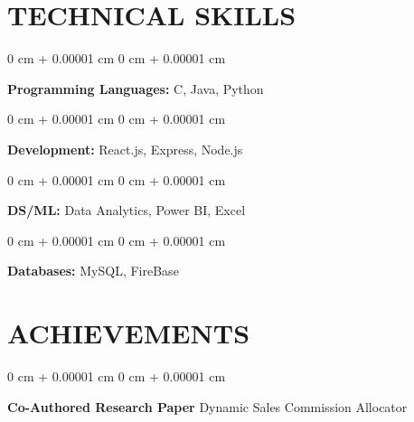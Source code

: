 \documentclass[10pt, letterpaper]{article}
\newenvironment{onecolentry}{
    \begin{adjustwidth}{
        0 cm + 0.00001 cm
    }{
        0 cm + 0.00001 cm
    }
}{
    \end{adjustwidth}
} %
\begin{document}
\section{\Large TECHNICAL SKILLS}



        
        \begin{onecolentry}
           \fontsize{12pt}{12pt}\textbf{Programming Languages:}  \fontsize{12pt}{12pt}\selectfont C, Java, Python
        \end{onecolentry}

        \vspace{0.2 cm}

        \begin{onecolentry}
            \fontsize{12pt}{12pt}\textbf{Development:} 
            \fontsize{12pt}{12pt}\selectfont React.js, Express, Node.js
        \end{onecolentry}
        \vspace{0.2 cm}

        \begin{onecolentry}
            \fontsize{12pt}{12pt}\textbf{DS/ML:} 
            \fontsize{12pt}{12pt}\selectfont Data Analytics, Power BI, Excel
        \end{onecolentry}

        \vspace{0.2 cm}

        \begin{onecolentry}
            \fontsize{12pt}{12pt}\textbf{Databases:} 
            \fontsize{12pt}{12pt}\selectfont  MySQL, FireBase
        \end{onecolentry}
         \vspace{0.2 cm}

     \section{\Large ACHIEVEMENTS}

 \vspace{0.2 cm}

        \begin{onecolentry}
           \fontsize{12pt}{12pt} \textbf{Co-Authored Research Paper}\AND%
  \fontsize{11pt}{11pt}\selectfont Dynamic Sales Commission Allocator   %
        \end{onecolentry}

        
       

        \vspace{0.2 cm}
\end{document}
